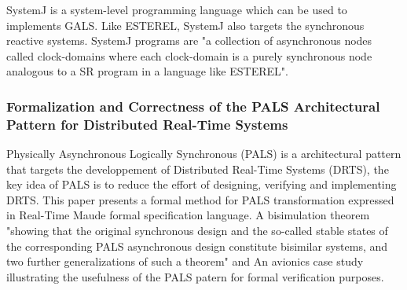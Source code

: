 SystemJ is a system-level programming language which can be used to implements GALS. Like ESTEREL, SystemJ also targets the synchronous reactive systems. SystemJ programs are "a collection of asynchronous nodes called clock-domains where each clock-domain is a purely synchronous node analogous to a SR program in a language like ESTEREL".

\subsubsection{Formalization and Correctness of the PALS Architectural Pattern for Distributed Real-Time Systems}

Physically Asynchronous Logically Synchronous (PALS) is a architectural pattern that targets the developpement of Distributed Real-Time Systems (DRTS), the key idea of PALS is to reduce the effort of designing, verifying and implementing DRTS. This paper presents a formal method for PALS transformation expressed in Real-Time Maude formal specification language. A bisimulation theorem "showing that the original synchronous design and
the so-called stable states of the corresponding PALS asynchronous design constitute bisimilar systems, and two further generalizations of such a theorem" and An avionics case study illustrating the usefulness of the PALS patern for formal verification purposes.
